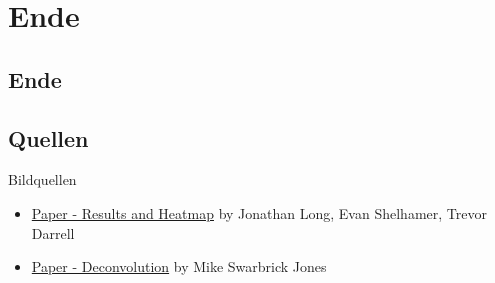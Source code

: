 \section*{Ende}
\subsection{Ende}
\subsection{Quellen}
\begin{frame}{Bildquellen}
    \begin{itemize}
        \item \href{http://arxiv.org/abs/1411.4038}{Paper - Results and Heatmap} by Jonathan Long, Evan Shelhamer, Trevor Darrell
    \end{itemize}
        \begin{itemize}
        \item \href{https://swarbrickjones.wordpress.com/2015/04/29/convolutional-autoencoders-in-pythontheanolasagne/}{Paper - Deconvolution} by Mike Swarbrick Jones
    \end{itemize}
\end{frame}

